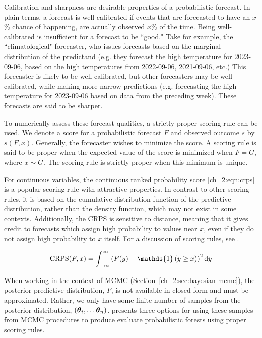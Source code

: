 Calibration and sharpness are desirable properties of a probabilistic forecast.
In plain terms, a forecast is well-calibrated if events that are forecasted to have an \( x \)\% chance of happening, are actually observed \( x \)\% of the time.
Being well-calibrated is insufficient for a forecast to be ``good."
Take for example, the ``climatological" forecaster, who issues forecasts based on the marginal distribution of the predictand (e.g. they forecast the high temperature for 2023-09-06, based on the high temperatures from 2022-09-06, 2021-09-06, etc.)
This forecaster is likely to be well-calibrated, but other forecasters may be well-calibrated, while making more narrow predictions (e.g. forecasting the high temperature for 2023-09-06 based on data from the preceding week).
These forecasts are said to be sharper.

To numerically assess these forecast qualities, a strictly proper scoring rule can be used.
We denote a score for a probabilistic forecast \( F \) and observed outcome \( s \) by \( s(F, x) \).
Generally, the forecaster wishes to minimize the score.
A scoring rule is said to be proper when the expected value of the score is minimized when \( F = G \), where $x \sim G$.
The scoring rule is strictly proper when this minimum is unique.

For continuous variables, the continuous ranked probability score \eqref{ch_2:eqn:crps} is a popular scoring rule with attractive properties.
In contrast to other scoring rules, it is based on the cumulative distribution function of the predictive distribution, rather than the density function, which may not exist in some contexts.
Additionally, the CRPS is sensitive to distance, meaning that it gives credit to forecasts which assign high probability to values near \( x \), even if they do not assign high probability to \( x \) itself.
For a discussion of scoring rules, see \citet{gneiting2007strictly}.

\begin{equation}
    \operatorname{CRPS}(F, x) = \int_{-\infty}^{\infty} \left( F(y) - \mathds{1} \left( y \geq x \right) \right)^2 \rmd y
    \label{ch_2:eqn:crps}
\end{equation}

When working in the context of MCMC (Section~\ref{ch_2:sec:bayesian-mcmc}), the posterior predictive distribution, \( F \), is not available in closed form and must be approximated.
Rather, we only have some finite number of samples from the posterior distribution, \( \left( \boldsymbol{\theta}_i, \ldots \boldsymbol{\theta}_n \right) \).
\citet{kruger2021predictive} presents three options for using these samples from MCMC procedures to produce evaluate probabilistic forests using proper scoring rules.

